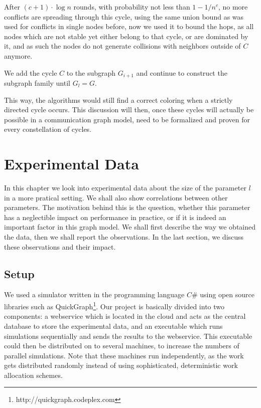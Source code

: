 After $(c+1) \cdot \log n$ rounds, with probability not less than $1 - 1/n^c$, no more conflicts are spreading through this cycle, using the same union bound as was used for conflicts in single nodes before, now we used it to bound the hops, as all nodes which are not stable yet either belong to that cycle, or are dominated by it, and as such the nodes do not generate collisions with neighbors outside of $C$ anymore.

We add the cycle $C$ to the subgraph $G_{i+1}$ and continue to construct the subgraph family until $G_l = G$.

This way, the algorithms would still find a correct coloring when a strictly directed cycle occurs. This discussion will then, once these cycles will actually be possible in a communication graph model, need to be formalized and proven for every constellation of cycles.


\chapter{Experimental Data}

In this chapter we look into experimental data about the size of the parameter $l$ in a more pratical setting. We shall also show correlations between other parameters. The motivation behind this is the question, whether this parameter has a neglectible impact on performance in practice, or if it is indeed an important factor in this graph model. We shall first describe the way we obtained the data, then we shall report the observations. In the last section, we discuss these observations and their impact.


\section{Setup}

We used a simulator written in the programming language $C\#$ using open source libraries such as QuickGraph\footnote{http://quickgraph.codeplex.com}. Our project is basically divided into two components: a webservice which is located in the cloud and acts as the central database to store the experimental data, and an executable which runs simulations sequentially and sends the results to the webservice. This executable could then be distributed on to several machines, to increase the numbers of parallel simulations. Note that these machines run independently, as the work gets distributed randomly instead of using sophisticated, deterministic work allocation schemes.


